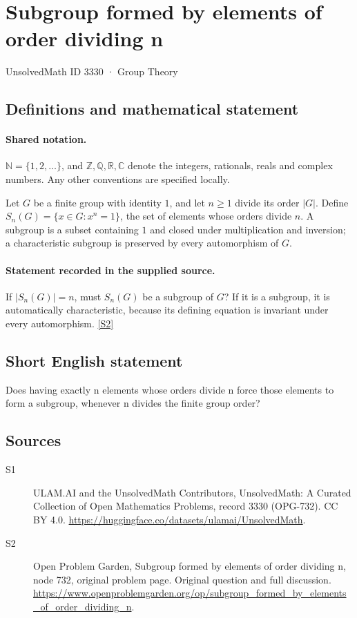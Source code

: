 \documentclass[11pt]{article}
\newcommand{\sref}[2]{\hyperlink{source:#1:#2}{[S#2]}}
\begin{document}
\setcounter{section}{3329}
\section{Subgroup formed by elements of order dividing n}\label{3330}
{\small\sffamily UnsolvedMath ID 3330 · Group Theory}
\subsection{Definitions and mathematical statement}

\paragraph{Shared notation.}$\mathbb N=\{1,2,\ldots\}$, and $\mathbb Z,\mathbb Q,\mathbb R,\mathbb C$ denote the integers, rationals, reals and complex numbers. Any other conventions are specified locally.


Let $G$ be a finite group with identity $1$, and let $n\geq1$ divide its order $|G|$. Define $S_n(G)=\{x\in G:x^n=1\}$, the set of elements whose orders divide $n$. A subgroup is a subset containing $1$ and closed under multiplication and inversion; a characteristic subgroup is preserved by every automorphism of $G$.
\paragraph{Statement recorded in the supplied source.}
If $|S_n(G)|=n$, must $S_n(G)$ be a subgroup of $G$? If it is a subgroup, it is automatically characteristic, because its defining equation is invariant under every automorphism. \sref{3330}{2}
\subsection{Short English statement}
Does having exactly n elements whose orders divide n force those elements to form a subgroup, whenever n divides the finite group order?
\subsection{Sources}
\begin{description}
\item[\hypertarget{source:3330:1}{S1}] ULAM.AI and the UnsolvedMath Contributors, UnsolvedMath: A Curated Collection of Open Mathematics Problems, record 3330 (OPG-732). CC BY 4.0. \url{https://huggingface.co/datasets/ulamai/UnsolvedMath}.
\item[\hypertarget{source:3330:2}{S2}] Open Problem Garden, Subgroup formed by elements of order dividing n, node 732, original problem page. Original question and full discussion. \url{https://www.openproblemgarden.org/op/subgroup_formed_by_elements_of_order_dividing_n}.

\end{description}
\label{end:3330}
\end{document}
